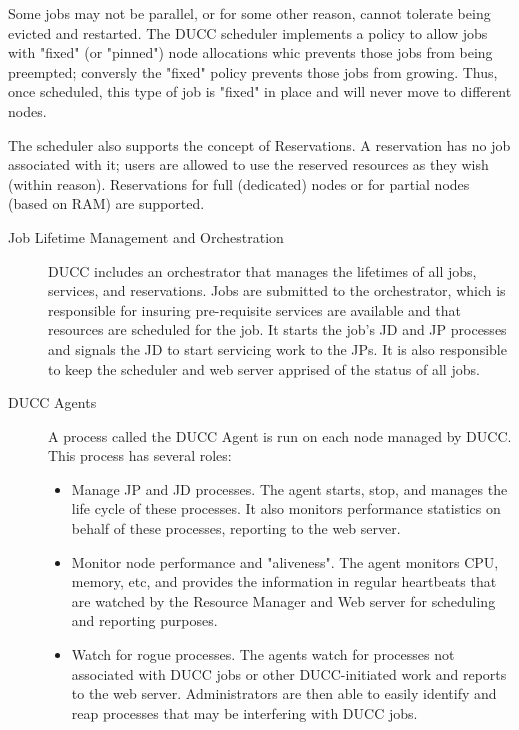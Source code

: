     Some jobs may not be parallel, or for some other reason, cannot tolerate being evicted and
    restarted. The DUCC scheduler implements a policy to allow jobs with "fixed" (or "pinned") node
    allocations whic prevents those jobs from being preempted; conversly the "fixed" policy prevents
    those jobs from growing. Thus, once scheduled, this type of job is "fixed" in place and will
    never move to different nodes.

    The scheduler also supports the concept of Reservations. A reservation has no job associated
    with it; users are allowed to use the reserved resources as they wish (within
    reason). Reservations for full (dedicated) nodes or for partial nodes (based on RAM) are
    supported.

    \begin{description}
      \item[Job Lifetime Management and Orchestration] DUCC includes an orchestrator that manages the
        lifetimes of all jobs, services, and reservations. Jobs are submitted to the orchestrator, which
        is responsible for insuring pre-requisite services are available and that resources are
        scheduled for the job. It starts the job's JD and JP processes and signals the JD to start
        servicing work to the JPs. It is also responsible to keep the scheduler and web server apprised
        of the status of all jobs.
        
      \item[DUCC Agents] A process called the DUCC Agent is run on each node managed by DUCC. This 
        process has several roles: 
        \begin{itemize}
            \item Manage JP and JD processes. The agent starts, stop, and manages the life cycle of these
              processes. It also monitors performance statistics on behalf of these processes, reporting to
              the web server.
 
            \item Monitor node performance and "aliveness". The agent monitors CPU, memory, etc, and provides the
              information in regular heartbeats that are watched by the Resource Manager and Web server for
              scheduling and reporting purposes.
            
            \item Watch for rogue processes. The agents watch for processes not associated with DUCC jobs or other
              DUCC-initiated work and reports to the web server. Administrators are then able to easily
              identify and reap processes that may be interfering with DUCC jobs.  
        \end{itemize}


\end{description}
